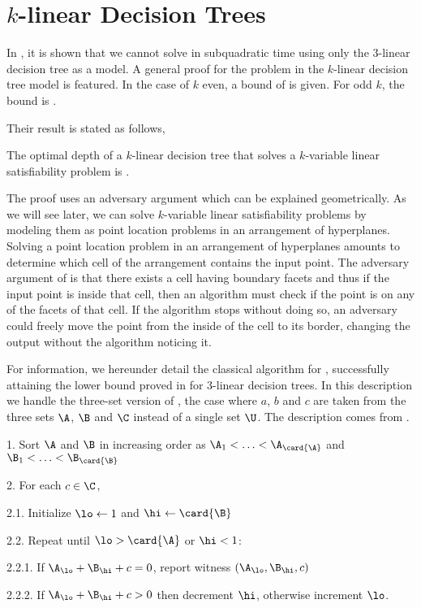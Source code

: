 \section{$k$-linear Decision Trees}

In \citet*{erickson:1999}, it is shown that we cannot solve \threeSUM in
subquadratic time using only the $3$-linear decision tree as a model. A general
proof for the \kLDT problem in the $k$-linear decision tree model is featured.
In the case of $k$ even, a bound of  is given. For
odd $k$, the bound is .

Their result is stated as follows,
\begin{theorem}
The optimal depth of a \(k\)-linear decision tree that solves
a \(k\)-variable linear satisfiability problem is .
\end{theorem}

The proof uses an adversary argument which can be explained geometrically. As
we will see later, we can solve \(k\)-variable linear satisfiability problems
by modeling them as point location problems in an arrangement of hyperplanes.
Solving a point location problem in an arrangement of hyperplanes amounts to
determine which cell of the arrangement contains the input point. The adversary
argument of \citet*{erickson:1999} is that there exists a cell having
 boundary facets and thus if the input point is inside
that cell, then an algorithm must check if the point is on any of the facets of
that cell. If the algorithm stops without doing so, an adversary could freely
move the point from the inside of the cell to its border, changing the output
without the algorithm noticing it.

For information, we hereunder detail the classical  algorithm for
\threeSUM, successfully attaining the lower bound proved in
\cite{erickson:1999} for $3$-linear decision trees. In this description we
handle the three-set version of \threeSUM, \ie the case where $a$, $b$ and $c$
are taken from the three sets $\A$, $\B$ and $\C$ instead of a single set $\U$.
The description comes from \citet*{gronlund:2014}.


\begin{algorithm}
\item[1.] Sort $\A$ and $\B$ in increasing order as $\A_1 < \ldots <
\A_{\card{\A}}$ and $\B_1 < \ldots < \B_{\card{\B}}$
\item[2.] For each $c \in \C$,
\item[2.1.] Initialize $\lo \gets 1$ and $\hi \gets \card{\B}$
\item[2.2.] Repeat until $\lo > \card{\A}$ or $\hi < 1$:
\item[2.2.1.] If $\A_{\lo} + \B_{\hi} + c = 0$, report witness $(\A_{\lo},
\B_{\hi}, c)$
\item[2.2.2.] If $\A_{\lo} + \B_{\hi} + c > 0$ then decrement $\hi$, otherwise
increment $\lo$.
\end{algorithm}


